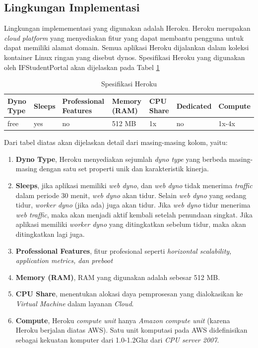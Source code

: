 \subsection{Lingkungan Implementasi}
		\label{sec:lingkungan_implementasi}
			Lingkungan implemementasi yang digunakan adalah Heroku. Heroku merupakan \textit{cloud platform} yang menyediakan fitur yang dapat membantu pengguna untuk dapat memiliki alamat domain. Semua aplikasi Heroku dijalankan dalam koleksi kontainer Linux ringan yang disebut dynos. Spesifikasi Heroku yang digunakan oleh IFStudentPortal akan dijelaskan pada Tabel \ref{tab:dynotype}
\begin{table}[H]
	\centering
		\caption{Spesifikasi Heroku}
			\begin{tabular}{ |p{1.5cm}|p{1.5cm}|p{2cm}|p{1.5cm}|p{1.5cm}|p{1.5cm}|p{1.5cm}|}
			\hline
			Dyno Type & Sleeps & Professional Features & Memory (RAM) & CPU Share & Dedicated & Compute \\ \hline
			free & yes & no & 512 MB & 1x & no & 1x-4x \\ \hline
			\end{tabular}
		\label{tab:dynotype}
\end{table}
			Dari tabel diatas akan dijelaskan detail dari masing-masing kolom, yaitu:
			\begin{enumerate}
				\item \textbf{Dyno Type}, Heroku menyediakan sejumlah \textit{dyno type} yang berbeda masing-masing dengan satu set properti unik dan karakteristik kinerja.
				\item \textbf{Sleeps}, jika aplikasi memiliki \textit{web dyno}, dan \textit{web dyno} tidak menerima \textit{traffic} dalam periode 30 menit, \textit{web dyno} akan tidur. Selain \textit{web dyno} yang sedang tidur, \textit{worker dyno} (jika ada) juga akan tidur. Jika \textit{web dyno} tidur menerima \textit{web traffic}, maka akan menjadi aktif kembali setelah penundaan singkat. Jika aplikasi memiliki \textit{worker dyno} yang ditingkatkan sebelum tidur, maka akan ditingkatkan lagi juga.  
				\item \textbf{Professional Features}, fitur profesional seperti \textit{horizontal scalability, application metrics, dan preboot}
				\item \textbf{Memory (RAM)}, RAM yang digunakan adalah sebesar 512 MB.
				\item \textbf{CPU Share}, menentukan alokasi daya pemprosesan yang dialokasikan ke \textit{Virtual Machine} dalam layanan \textit{Cloud}.
				\item \textbf{Compute}, Heroku \textit{compute unit} hanya \textit{Amazon compute unit} (karena Heroku berjalan diatas AWS). Satu unit komputasi pada AWS didefinisikan sebagai kekuatan komputer dari 1.0-1.2Ghz dari \textit{CPU server 2007}.
			\end{enumerate}
				
